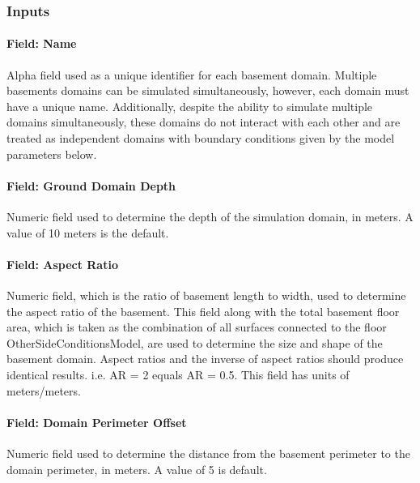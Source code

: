 \subsubsection{Inputs}\label{inputs-17-004}

\paragraph{Field: Name}\label{field-name-9-009}

Alpha field used as a unique identifier for each basement domain. Multiple basements domains can be simulated simultaneously, however, each domain must have a unique name. Additionally, despite the ability to simulate multiple domains simultaneously, these domains do not interact with each other and are treated as independent domains with boundary conditions given by the model parameters below.

\paragraph{Field: Ground Domain Depth}\label{field-ground-domain-depth-1}

Numeric field used to determine the depth of the simulation domain, in meters. A value of 10 meters is the default.

\paragraph{Field: Aspect Ratio}\label{field-aspect-ratio-1}

Numeric field, which is the ratio of basement length to width, used to determine the aspect ratio of the basement. This field along with the total basement floor area, which is taken as the combination of all surfaces connected to the floor OtherSideConditionsModel, are used to determine the size and shape of the basement domain. Aspect ratios and the inverse of aspect ratios should produce identical results. i.e. AR = 2 equals AR = 0.5. This field has units of meters/meters.

\paragraph{Field: Domain Perimeter Offset}\label{field-domain-perimeter-offset}

Numeric field used to determine the distance from the basement perimeter to the domain perimeter, in meters. A value of 5 is default.

